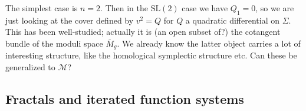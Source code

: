 The simplest case is $n=2$. Then in the $\mathrm{SL}(2)$ case we have $Q_1=0$, so we are just looking at the cover defined by $v^2 = Q$ for $Q$ a quadratic differential on $\Sigma$. This has been well-studied; actually it is (an open subset of?) the cotangent bundle of the moduli space $\overline{M}_g$. We already know the latter object carries a lot of interesting structure, like the homological symplectic structure etc. Can these be generalized to $\mathcal{M}$?


\subsection{Fractals and iterated function systems}